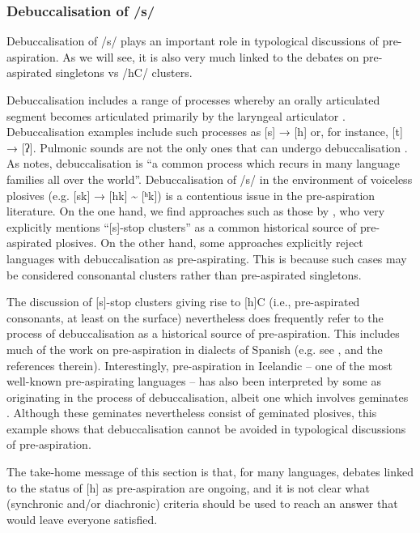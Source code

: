 \documentclass[output=paper]{langscibook}
\begin{document}
\subsubsection{Debuccalisation of /s/}
\largerpage
Debuccalisation of /s/ plays an important role in typological discussions of pre-aspiration. As we will see, it is also very much linked to the debates on pre-aspirated singletons vs /hC/ clusters.

Debuccalisation includes a range of processes whereby an orally articulated segment becomes articulated primarily by the laryngeal articulator \citep{EslingEtAl2019}. Debuccalisation examples include such processes as [s] → [h] or, for instance, [t] → [ʔ]. Pulmonic sounds are not the only ones that can undergo debuccalisation \citep{Fallon1998}. As \citet[200]{Fallon1998} notes, debuccalisation is “a common process which recurs in many language families all over the world”. Debuccalisation of /s/ in the environment of voiceless plosives (e.g. [sk] → [hk] {\textasciitilde} [ʰk]) is a contentious issue in the pre\hyp aspiration literature. On the one hand, we find approaches such as those by \citet[593]{Silverman2003}, who very explicitly mentions “[s]-stop clusters” as a common historical source of pre-aspirated plosives. On the other hand, some approaches explicitly reject languages with debuccalisation as pre-aspirating. This is because such cases may be considered consonantal clusters rather than pre-aspirated singletons.

The discussion of [s]-stop clusters giving rise to [h]C (i.e., pre-aspirated consonants, at least on the surface) nevertheless does frequently refer to the process of debuccalisation as a historical source of pre-aspiration. This includes much of the work on pre\hyp aspiration in dialects of Spanish (e.g. see \citealt{Chappell2014,Chappell2015, CronenbergEtAl2020, Torreira2007}, and the references therein). Interestingly, pre\hyp aspiration in Icelandic – one of the most well-known pre-aspirating languages – has also been interpreted by some as originating in the process of debuccalisation, albeit one which involves geminates \citep[36]{Fallon1998}. Although these geminates nevertheless consist of geminated plosives, this example shows that debuccalisation cannot be avoided in typological discussions of pre-aspiration.

The take-home message of this section is that, for many languages, debates linked to the status of [h] as pre\hyp aspiration are ongoing, and it is not clear what (synchronic and/or diachronic) criteria should be used to reach an answer that would leave everyone satisfied. 
\end{document}
